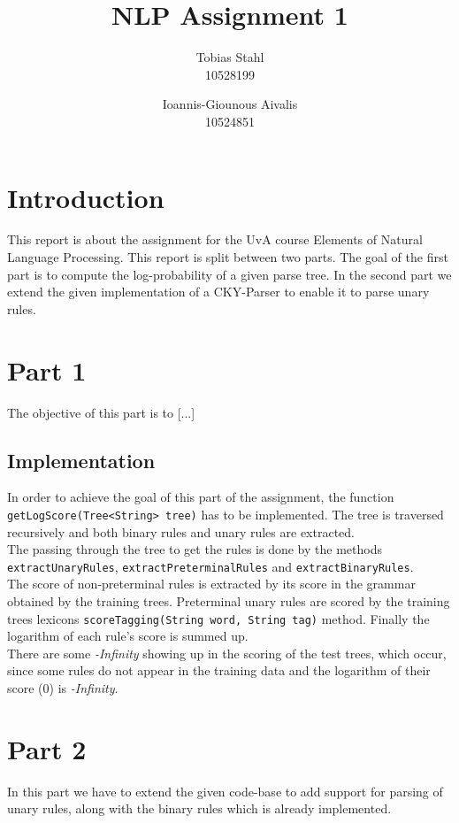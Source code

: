 \documentclass[11pt]{article}
\title{
	\textbf{NLP Assignment 1}
}
\author{Tobias Stahl \\ 10528199 \and Ioannis-Giounous Aivalis \\ 10524851 }
\begin{document}
\maketitle


\section{Introduction}
This report is about the assignment for the UvA course Elements of Natural Language Processing. This report is split between two parts. The goal of the first part is to compute the log-probability of a given parse tree. In the second part we extend the given implementation of a CKY-Parser to enable it to parse unary rules.\\

\section{Part 1}
The objective of this part is to [...]

\subsection{Implementation}
In order to achieve the goal of this part of the assignment, the function \texttt {getLogScore(Tree<String> tree)} has to be implemented. The tree is traversed recursively and both binary rules and unary rules are extracted.\\
The passing through the tree to get the rules is done by the methods \texttt{extractUnaryRules}, \texttt{extractPreterminalRules} and \texttt{extractBinaryRules}.\\
The score of non-preterminal rules is extracted by its score in the grammar obtained by the training trees. Preterminal unary rules are scored by the training trees lexicons \texttt{scoreTagging(String word, String tag)} method.
Finally the logarithm of each rule's score is summed up.\\
There are some \emph{-Infinity} showing up in the scoring of the test trees, which occur, since some rules do not appear in the training data and the logarithm of their score (0) is \emph{-Infinity}.\\

\section{Part 2}
In this part we have to extend the given code-base to add support for parsing of unary rules, along with the binary rules which is already implemented.
\end{document}
